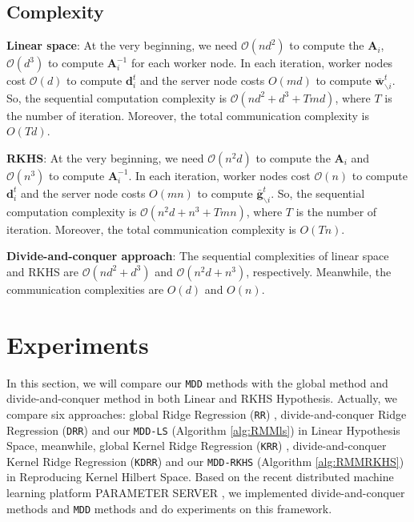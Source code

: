 \documentclass{article}
\begin{document}
\subsection{Complexity}
\textbf{Linear space}: At the very beginning, we need $\mathcal{O}\left(nd^2\right)$
to compute the $\mathbf A_i$,  $\mathcal{O}(d^3)$ to compute $\mathbf A_i^{-1}$ for each worker node.
In each iteration, worker nodes cost $\mathcal{O}(d)$ to compute $\mathbf d^t_i$ and
the server node costs $O(md)$ to compute $\bar{\mathbf w}^{t}_{\backslash i}$.
So, the sequential computation complexity is $\mathcal{O}\left(nd^2+d^3+Tmd\right)$, where $T$ is the number of iteration.
Moreover, the total communication complexity is $O(Td)$.

\textbf{RKHS}: At the very beginning, we need $\mathcal{O}\left(n^2d\right)$ to compute the $\mathbf A_i$
and $\mathcal{O}(n^3)$ to compute $\mathbf A_i^{-1}$.
In each iteration, worker nodes cost $\mathcal{O}(n)$ to compute $\mathbf d^t_i$
and the server node costs $O(mn)$ to compute $\bar{\mathbf g}^{t}_{\backslash i}$.
So, the sequential computation complexity is $\mathcal{O}\left(n^2d+n^3+Tmn\right)$, where $T$ is the number of iteration.
Moreover, the total communication complexity is $O(Tn)$.

\textbf{Divide-and-conquer approach}: The sequential complexities of linear space and RKHS
are $\mathcal{O}\left(nd^2+d^3\right)$ and $\mathcal{O}\left(n^2d+n^3\right)$, respectively.
Meanwhile, the communication complexities are $O(d)$ and $O(n)$.

\section{Experiments}
In this section, we will compare our  \texttt{MDD} methods with the global method and divide-and-conquer method in both Linear and RKHS Hypothesis.
Actually, we compare six approaches: global Ridge Regression (\texttt{RR}) \cite{hoerl1970ridge},
divide-and-conquer Ridge Regression (\texttt{DRR}) and our \texttt{MDD-LS} (Algorithm \ref{alg:RMMls}) in Linear Hypothesis Space,
meanwhile, global Kernel Ridge Regression (\texttt{KRR}) \cite{an2007fast},
divide-and-conquer Kernel Ridge Regression (\texttt{KDRR}) \cite{Zhang2013} and our \texttt{MDD-RKHS} (Algorithm \ref{alg:RMMRKHS}) in Reproducing Kernel Hilbert Space.
Based on the recent distributed machine learning platform PARAMETER SERVER \cite{li2014scaling},
we implemented divide-and-conquer methods and \texttt{MDD} methods and do experiments on this framework.
\end{document}
